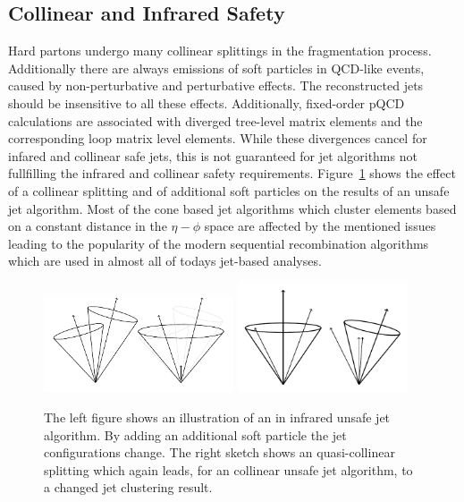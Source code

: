 \subsection{Collinear and Infrared Safety}
\label{sec:coll_safety}

Hard partons undergo many collinear splittings in the fragmentation process.
Additionally there are always emissions of soft particles in QCD-like events,
caused by non-perturbative and perturbative effects. The reconstructed jets
should be insensitive to all these effects. Additionally, fixed-order pQCD
calculations are associated with diverged tree-level matrix elements and the
corresponding loop matrix level elements. While these divergences cancel for
infared and collinear safe jets, this is not guaranteed for jet algorithms not
fullfilling the infrared and collinear safety requirements. Figure~\ref{fig:infrared_safety}
shows the effect of a collinear splitting and of additional soft particles on
the results of an unsafe jet algorithm. Most of the cone based jet algorithms which cluster
elements based on a constant distance in the $\eta-\phi$ space are affected by
the mentioned issues leading to the popularity of the modern sequential recombination
algorithms which are used in almost all of todays jet-based analyses.

\begin{figure}[htb]
    \centering
    \includegraphics[width=0.5\textwidth]{figures/drawings/infrared_safety/jetinfrared.pdf}\hfill
    \includegraphics[width=0.45\textwidth]{figures/drawings/infrared_safety/jetcollinear.pdf}
    \caption{The left figure shows an illustration of an in infrared unsafe jet
        algorithm. By adding an additional soft particle the jet configurations
        change. The right sketch shows an quasi-collinear splitting which again leads,
        for an collinear unsafe jet algorithm, to a changed jet clustering result.}
    \label{fig:infrared_safety}
\end{figure}


